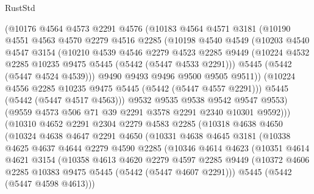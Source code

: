 \begin{lexlean}{RustStd}
\begin{coremodule}
            (@10176
              @4564
              @4573
              @2291
              @4576
              (@10183
                @4564
                @4571
                @3181
                (@10190
                  @4551
                  @4563
                  @4570
                  @2279
                  @4516
                  @2285
                  (@10198
                    @4540
                    @4549
                    (@10203
                      @4540
                      @4547
                      @3154
                      (@10210
                        @4539
                        @4546
                        @2279
                        @4523
                        @2285
                        @9449
                        (@10224 @4532 @2285 @10235 @9475 @5445 (@5442 (@5447 @4533 @2291)))
                        @5445
                        (@5442 (@5447 @4524 @4539)))
                      @9490
                      @9493
                      @9496
                      @9500
                      @9505
                      @9511))
                  (@10224 @4556 @2285 @10235 @9475 @5445 (@5442 (@5447 @4557 @2291)))
                  @5445
                  (@5442 (@5447 @4517 @4563)))
                @9532
                @9535
                @9538
                @9542
                @9547
                @9553)
              (@9559 @4573 @506 @71 @39 @2291 @3578 @2291 @2340 @10301 @9592)))
          (@10310
            @4652
            @2291
            @2304
            @2279
            @4583
            @2285
            (@10318
              @4638
              @4650
              (@10324
                @4638
                @4647
                @2291
                @4650
                (@10331
                  @4638
                  @4645
                  @3181
                  (@10338
                    @4625
                    @4637
                    @4644
                    @2279
                    @4590
                    @2285
                    (@10346
                      @4614
                      @4623
                      (@10351
                        @4614
                        @4621
                        @3154
                        (@10358
                          @4613
                          @4620
                          @2279
                          @4597
                          @2285
                          @9449
                          (@10372 @4606 @2285 @10383 @9475 @5445 (@5442 (@5447 @4607 @2291)))
                          @5445
                          (@5442 (@5447 @4598 @4613)))

\end{coremodule}
\end{lexlean}
